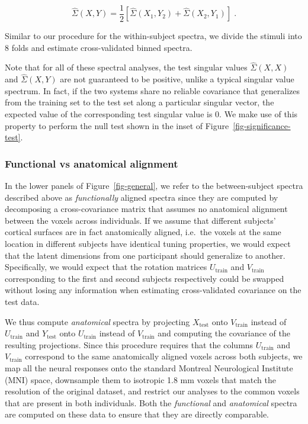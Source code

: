 \documentclass[10pt]{article}
\begin{document}
\[
\hat{\Sigma}(X,Y) = \frac{1}{2}\left[\hat{\Sigma}(X_1,Y_2) + \hat{\Sigma}(X_2,Y_1)\right]\;.
\]

Similar to our procedure for the within-subject spectra, we divide the
stimuli into 8 folds and estimate cross-validated binned spectra.

Note that for all of these spectral analyses, the test singular values
\(\hat{\Sigma}(X, X)\) and \(\hat{\Sigma}(X, Y)\) are not guaranteed to
be positive, unlike a typical singular value spectrum. In fact, if the
two systems share no reliable covariance that generalizes from the
training set to the test set along a particular singular vector, the
expected value of the corresponding test singular value is \(0\). We
make use of this property to perform the null test shown in the inset of
Figure~\ref{fig-significance-test}.

\subsubsection{Functional vs anatomical
alignment}\label{functional-vs-anatomical-alignment}

In the lower panels of Figure~\ref{fig-general}, we refer to the
between-subject spectra described above as \emph{functionally} aligned
spectra since they are computed by decomposing a cross-covariance matrix
that assumes no anatomical alignment between the voxels across
individuals. If we assume that different subjects' cortical surfaces are
in fact anatomically aligned, i.e.~the voxels at the same location in
different subjects have identical tuning properties, we would expect
that the latent dimensions from one participant should generalize to
another. Specifically, we would expect that the rotation matrices
\(U_\text{train}\) and \(V_\text{train}\) corresponding to the first and
second subjects respectively could be swapped without losing any
information when estimating cross-validated covariance on the test data.

We thus compute \emph{anatomical} spectra by projecting
\(X_\text{test}\) onto \(V_\text{train}\) instead of \(U_\text{train}\)
and \(Y_\text{test}\) onto \(U_\text{train}\) instead of
\(V_\text{train}\) and computing the covariance of the resulting
projections. Since this procedure requires that the columns
\(U_\text{train}\) and \(V_\text{train}\) correspond to the same
anatomically aligned voxels across both subjects, we map all the neural
responses onto the standard Montreal Neurological Institute (MNI) space,
downsample them to isotropic 1.8 mm voxels that match the resolution of
the original dataset, and restrict our analyses to the common voxels
that are present in both individuals. Both the \emph{functional} and
\emph{anatomical} spectra are computed on these data to ensure that they
are directly comparable.
\end{document}
